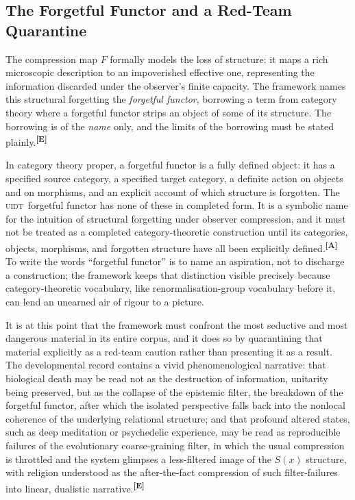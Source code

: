 \documentclass[12pt,a4paper,twoside]{article}
\theoremstyle{plain}
\theoremstyle{definition}
\theoremstyle{remark}
\newcommand{\UIDT}{\textsc{uidt}}
\newcommand{\catmark}[1]{\textsuperscript{\textsf{\textbf{[#1]}}}}
\begin{document}
\subsection{The Forgetful Functor and a Red-Team Quarantine}
\label{subsec:forgetful-functor}

The compression map $F$ formally models the loss of structure: it maps a rich microscopic description to an impoverished effective one, representing the information discarded under the observer's finite capacity. The framework names this structural forgetting the \emph{forgetful functor}, borrowing a term from category theory where a forgetful functor strips an object of some of its structure. The borrowing is of the \emph{name} only, and the limits of the borrowing must be stated plainly.\catmark{E}

In category theory proper, a forgetful functor is a fully defined object: it has a specified source category, a specified target category, a definite action on objects and on morphisms, and an explicit account of which structure is forgotten. The \UIDT\ forgetful functor has none of these in completed form. It is a symbolic name for the intuition of structural forgetting under observer compression, and it must not be treated as a completed category-theoretic construction until its categories, objects, morphisms, and forgotten structure have all been explicitly defined.\catmark{A} To write the words ``forgetful functor'' is to name an aspiration, not to discharge a construction; the framework keeps that distinction visible precisely because category-theoretic vocabulary, like renormalisation-group vocabulary before it, can lend an unearned air of rigour to a picture.

It is at this point that the framework must confront the most seductive and most dangerous material in its entire corpus, and it does so by quarantining that material explicitly as a red-team caution rather than presenting it as a result. The developmental record contains a vivid phenomenological narrative: that biological death may be read not as the destruction of information, unitarity being preserved, but as the collapse of the epistemic filter, the breakdown of the forgetful functor, after which the isolated perspective falls back into the nonlocal coherence of the underlying relational structure; and that profound altered states, such as deep meditation or psychedelic experience, may be read as reproducible failures of the evolutionary coarse-graining filter, in which the usual compression is throttled and the system glimpses a less-filtered image of the $S(x)$ structure, with religion understood as the after-the-fact compression of such filter-failures into linear, dualistic narrative.\catmark{E}
\end{document}
